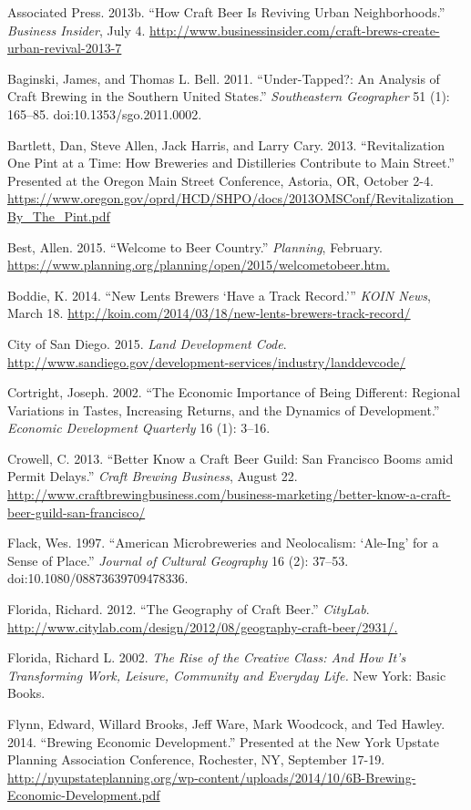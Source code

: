 \documentclass[]{article}
\begin{document}
Associated Press. 2013b. ``How Craft Beer Is Reviving Urban
Neighborhoods.'' \emph{Business Insider}, July 4.
\url{http://www.businessinsider.com/craft-brews-create-urban-revival-2013-7}

Baginski, James, and Thomas L. Bell. 2011. ``Under-Tapped?: An Analysis
of Craft Brewing in the Southern United States.'' \emph{Southeastern
Geographer} 51 (1): 165--85. doi:10.1353/sgo.2011.0002.

Bartlett, Dan, Steve Allen, Jack Harris, and Larry Cary. 2013.
``Revitalization One Pint at a Time: How Breweries and Distilleries
Contribute to Main Street.'' Presented at the Oregon Main Street
Conference, Astoria, OR, October 2-4.
\url{https://www.oregon.gov/oprd/HCD/SHPO/docs/2013OMSConf/Revitalization\_By\_The\_Pint.pdf}

Best, Allen. 2015. ``Welcome to Beer Country.'' \emph{Planning},
February. \url{https://www.planning.org/planning/open/2015/welcometobeer.htm.}

Boddie, K. 2014. ``New Lents Brewers `Have a Track Record.''' \emph{KOIN
News}, March 18.
\url{http://koin.com/2014/03/18/new-lents-brewers-track-record/}

City of San Diego. 2015. \emph{Land Development Code}.
\url{http://www.sandiego.gov/development-services/industry/landdevcode/}

Cortright, Joseph. 2002. ``The Economic Importance of Being Different:
Regional Variations in Tastes, Increasing Returns, and the Dynamics of
Development.'' \emph{Economic Development Quarterly} 16 (1): 3--16.

Crowell, C. 2013. ``Better Know a Craft Beer Guild: San Francisco Booms
amid Permit Delays.'' \emph{Craft Brewing Business}, August 22.
\url{http://www.craftbrewingbusiness.com/business-marketing/better-know-a-craft-beer-guild-san-francisco/}

Flack, Wes. 1997. ``American Microbreweries and Neolocalism: `Ale-Ing'
for a Sense of Place.'' \emph{Journal of Cultural Geography} 16 (2):
37--53. doi:10.1080/08873639709478336.

Florida, Richard. 2012. ``The Geography of Craft Beer.'' \emph{CityLab}.
\url{http://www.citylab.com/design/2012/08/geography-craft-beer/2931/.}

Florida, Richard L. 2002. \emph{The Rise of the Creative Class: And How
It's Transforming Work, Leisure, Community and Everyday Life.} New York:
Basic Books.

Flynn, Edward, Willard Brooks, Jeff Ware, Mark Woodcock, and Ted Hawley.
2014. ``Brewing Economic Development.'' Presented at the New York
Upstate Planning Association Conference, Rochester, NY, September 17-19.
\url{http://nyupstateplanning.org/wp-content/uploads/2014/10/6B-Brewing-Economic-Development.pdf}
\end{document}
